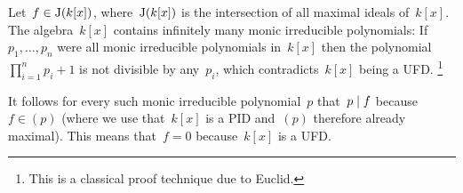 \section{}


Let~$f \in \operatorname{J}(k[x])$, where~$\operatorname{J}(k[x])$ is the intersection of all maximal ideals of~$k[x]$.
The algebra~$k[x]$ contains infinitely many monic irreducible polynomials:
If~$p_1, \dotsc, p_n$ were all monic irreducible polynomials in~$k[x]$ then the polynomial~$\prod_{i=1}^n p_i + 1$ is not divisible by any~$p_i$, which contradicts~$k[x]$ being a UFD.%
\footnote{This is a classical proof technique due to Euclid.}

It follows for every such monic irreducible polynomial~$p$ that~$p \mid f$ because~$f \in (p)$ (where we use that~$k[x]$ is a PID and~$(p)$ therefore already maximal).
This means that~$f = 0$ because~$k[x]$ is a UFD.




